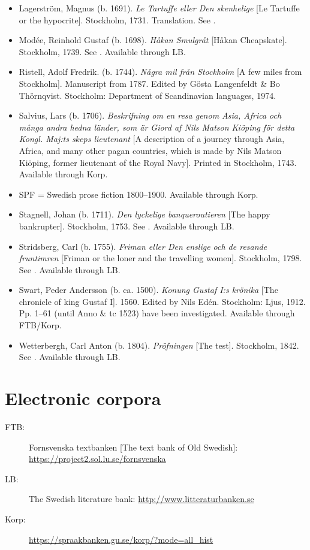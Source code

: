 \documentclass[output=paper]{langscibook}
\begin{document}
\begin{itemize}[label={},noitemsep,leftmargin=\parindent,itemindent=-\parindent]
\item Lagerström, Magnus (b. 1691). \textit{Le Tartuffe eller Den skenhelige} [Le Tartuffe or the hypocrite]. Stockholm, 1731. Translation. See \citet{MarttalaStromquist2001}.
\item Modée, Reinhold Gustaf (b. 1698). \textit{Håkan Smulgråt} [Håkan Cheapskate]. Stockholm, 1739. See \citet{MarttalaStromquist2001}. Available through LB.
\item Ristell, Adolf Fredrik. (b. 1744). \textit{Några mil från Stockholm} [A few miles from Stockholm]. Manuscript from 1787. Edited by Gösta Langenfeldt \& Bo Thörnqvist. Stockholm: Department of Scandinavian languages, 1974. 
\item Salvius, Lars (b. 1706). \textit{Beskrifning om en resa genom Asia, Africa och många andra hedna länder, som är Giord af Nils Matson Kiöping för detta Kongl. Maj:ts skeps lieutenant} [A description of a journey through Asia, Africa, and many other pagan countries, which is made by Nils Matson Kiöping, former lieutenant of the Royal Navy]. Printed in Stockholm, 1743. Available through Korp. 
\item SPF = Swedish prose fiction 1800–1900. Available through Korp.
\item Stagnell, Johan (b. 1711). \textit{Den lyckelige banqueroutieren} [The happy bankrupter]. Stockholm, 1753. See \citet{MarttalaStromquist2001}. Available through LB.
\item Stridsberg, Carl (b. 1755). \textit{Friman eller Den enslige och de resande fruntimren} [Friman or the loner and the travelling women]. Stockholm, 1798. See \citet{MarttalaStromquist2001}. Available through LB.
\item Swart, Peder Andersson (b. ca. 1500). \textit{Konung Gustaf I:s krönika} [The chronicle of king Gustaf I]. 1560. Edited by Nils Edén. Stockholm: Ljus, 1912. Pp. 1–61 (until Anno \& tc 1523) have been investigated. Available through FTB/Korp.
\item Wetterbergh, Carl Anton (b. 1804). \textit{Pröfningen} [The test]. Stockholm, 1842. See \citet{MarttalaStromquist2001}. Available through LB.
\end{itemize}

\section*{Electronic corpora}
\begin{description}
\item[\normalfont FTB:]   Fornsvenska textbanken [The text bank of Old Swedish]: \url{https://project2.sol.lu.se/fornsvenska} 
\item[\normalfont LB:]    The Swedish literature bank: \url{http://www.litteraturbanken.se}
\item[\normalfont Korp:]  \url{https://spraakbanken.gu.se/korp/?mode=all_hist}
\end{description}

{\sloppy\printbibliography[heading=subbibliography,notkeyword=this]}
\end{document}
